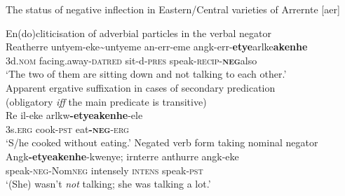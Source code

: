 \documentclass[output=paper]{langsci/langscibook}
\begin{document}
    \begin{exe}\ex\label{ex:austr-arrernte-east-central} 
    The status of negative inflection in Eastern\slash Central varieties of
        Arrernte [aer]
        \begin{xlist}
	\ex En(do)cliticisation of adverbial particles in the verbal negator\\
	\gll Re\textdblhyphen atherre untyem-eke\textasciitilde untyeme an-err-eme angk-err-\textbf{etye}\guillemotleft arlke\guillemotright \textbf{akenhe}\\
		3d.\textsc{nom} facing.away-\textsc{dat}\textdblhyphen\textsc{red} sit-d-\textsc{pres} speak-\textsc{recip}-\textbf{\textsc{neg}}\guillemotleft also\guillemotright\\
		\glt `The two of them are sitting down and not talking to each
            other.' \\ \hfill \citep[417]{Henderson2013}
%	
    \ex\label{ex:austr-arrernte-east-central-cook} 
    Apparent ergative suffixation in cases of secondary predication\\(obligatory \textsl{iff} the main predicate is transitive)\\
    \gll Re il-eke arlkw\textbf{-etye\textdblhyphen akenhe}-ele\\
    3s.\textsc{erg} cook-\textsc{pst} eat\textbf{-\textsc{neg}}-\textsc{erg}\\
    \glt `S/he cooked without eating.' \hfill \citep[418]{Henderson2013}
            \ex\label{ex:austr-arrernte-east-central-talkalot} Negated verb form taking nominal negator\\
    \gll Angk\textbf{-etye\textdblhyphen akenhe}-kwenye; irnterre anthurre angk-eke\\
    speak-\textsc{neg}-Nom\textsc{neg} intensely \textsc{intens} speak-\textsc{pst}\\
	\glt `(She) wasn't \textit{not} talking; she was talking a lot.' \hfill \citep[416]{Henderson2013}\\
        \end{xlist}\end{exe}
\end{document}
